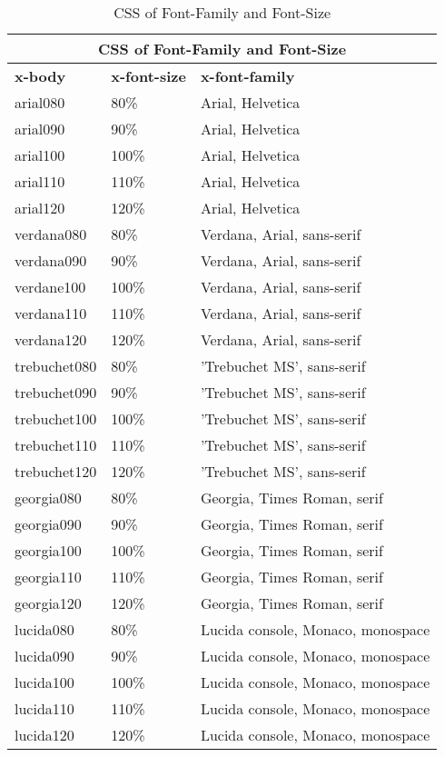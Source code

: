 \documentclass[12pt,a4paper,twosides,ngerman]{scrbook}
\begin{document}
\begin{table}[hbtp]
\begin{center}
\begin{tabular}{|l|l|l|}
  \hline
  \multicolumn{3}{|c|}{\textbf{CSS of Font-Family and Font-Size}} \\
  \hline
  \hline
  \textbf{x-body} & \textbf{x-font-size} & \textbf{x-font-family} \\
   \hline
   \hline
   arial080 &  80\%  & Arial, Helvetica  \\
   \hline
   arial090 &  90\%  & Arial, Helvetica  \\
   \hline
   arial100 & 100\%  & Arial, Helvetica  \\
   \hline
   arial110 & 110\%  & Arial, Helvetica  \\
   \hline
   arial120 & 120\%  & Arial, Helvetica  \\
   \hline
   verdana080 &  80\%  & Verdana, Arial, sans-serif  \\
   \hline
   verdana090 &  90\%  & Verdana, Arial, sans-serif  \\
   \hline
   verdane100 & 100\%  & Verdana, Arial, sans-serif  \\
   \hline
   verdana110 & 110\%  & Verdana, Arial, sans-serif  \\
   \hline
   verdana120 & 120\%  & Verdana, Arial, sans-serif  \\
   \hline
   trebuchet080 &  80\%  & 'Trebuchet MS', sans-serif  \\
   \hline
   trebuchet090 &  90\%  & 'Trebuchet MS', sans-serif  \\
   \hline
   trebuchet100 & 100\%  & 'Trebuchet MS', sans-serif  \\
   \hline
   trebuchet110 & 110\%  & 'Trebuchet MS', sans-serif  \\
   \hline
   trebuchet120 & 120\%  & 'Trebuchet MS', sans-serif  \\
   \hline
   georgia080 &  80\%  & Georgia, Times Roman, serif  \\
   \hline
   georgia090 &  90\%  & Georgia, Times Roman, serif  \\
   \hline
   georgia100 & 100\%  & Georgia, Times Roman, serif  \\
   \hline
   georgia110 & 110\%  & Georgia, Times Roman, serif  \\
   \hline
   georgia120 & 120\%  & Georgia, Times Roman, serif  \\
   \hline
   lucida080 &  80\%  & Lucida console, Monaco, monospace  \\
   \hline
   lucida090 &  90\%  & Lucida console, Monaco, monospace  \\
   \hline
   lucida100 & 100\%  & Lucida console, Monaco, monospace  \\
   \hline
   lucida110 & 110\%  & Lucida console, Monaco, monospace  \\
   \hline
   lucida120 & 120\%  & Lucida console, Monaco, monospace  \\
   \hline
\end{tabular}
\caption{CSS of Font-Family and Font-Size} 
\label{tab:ligatures}
\end{center}
\end{table} 
\end{document}
